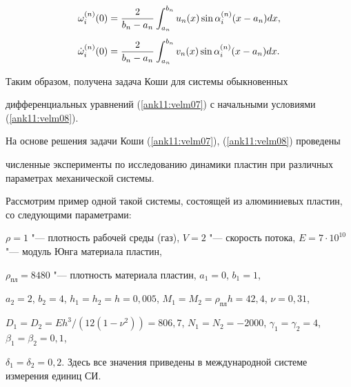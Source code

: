 \begin{equation}

\label{ank11:velm08}

\begin{array}{l}

\displaystyle  \omega _i^{(n)} (0) = \frac{2}{b_n - a_n} \int _{a_n} ^{b_n}  u_n (x)\sin \alpha

_i^{(n)} (x - a_n)dx, \\

\rule{0mm}{24pt}%

\displaystyle \dot {\omega} _i^{(n)} (0) =

\frac{2}{b_n - a_n} \int _{a_n}^{b_n}  v_n (x) \sin \alpha_i^{(n)}

(x - a_n)dx.

\end{array}

\end{equation}



Таким образом, получена задача Коши для системы обыкновенных

дифференциальных уравнений (\ref{ank11:velm07}) с начальными условиями (\ref{ank11:velm08}).



\smallskip




На основе решения задачи Коши (\ref{ank11:velm07}), (\ref{ank11:velm08}) проведены

численные эксперименты по исследованию динамики пластин при различных параметрах механической системы.

Рассмотрим пример одной такой системы, состоящей из алюминиевых пластин, со следующими параметрами:

$\rho = 1$ "--- плотность рабочей среды (газ), $V = 2$ "--- скорость потока, $E = 7 \cdot 10^{10}$ "--- модуль Юнга материала пластин, 

$\rho_{\text{пл}} = 8480$ "--- плотность материала пластин, $a_1 = 0$, $b_1 = 1$,

$a_2 = 2$, $b_2 = 4$, $h_1=h_2=h = 0,005$, $M_1 = M_2 = \rho _{\text{пл}} h = 42,4$, $\nu = 0,31$,

$D_1 = D_2 ={Eh^3}/({12 (1 - \nu ^2)}) = 806,7$, $N_1 = N_2 = -

2000$, $\gamma _1 = \gamma _2 = 4$, $\beta _1 = \beta _2 = 0,1$,

$\delta _1 = \delta _2 = 0,2$. Здесь все значения приведены в международной системе измерения единиц СИ.





